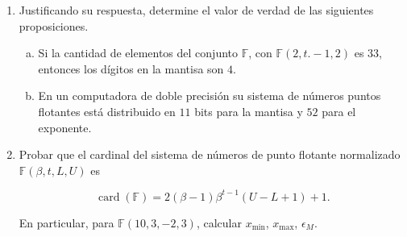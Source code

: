 \documentclass[
	spanish,
	8pt,
	utf8,
	xcolor=table,
	handout,
	aspectratio=169,
	professionalfonts,
	notheorems,
	mathserif,
]{beamer}
\begin{document}
\begin{frame}
\begin{enumerate}
		\item Justificando su respuesta, determine el valor de verdad de
		      las siguientes proposiciones.

		      \begin{enumerate}[a)]
			      \item

			            Si la cantidad de elementos del conjunto
			            $\mathbb{F}$, con $\mathbb{F}(2, t .-1,2)$ es $33$,
			            entonces los dígitos en la mantisa son $4$.

			      \item

			            En un computadora de doble precisión su sistema de
			            números puntos flotantes está distribuido en $11$
			            bits para la mantisa y $52$ para el exponente.

		      \end{enumerate}


		\item

		      Probar que el cardinal del sistema de números de punto
		      flotante normalizado $\mathbb{F}\left(\beta, t, L, U\right)$ es


		      \begin{equation*}
			      \operatorname{card}\left(\mathbb{F}\right)=
			      2\left(\beta-1\right)\beta^{t-1}\left(U-L+1\right)+1.
		      \end{equation*}

		      En particular, para $\mathbb{F}\left(10,3,-2,3\right)$,
		      calcular $x_{\min}$, $x_{\max}$, $\epsilon_{M}$.

	\end{enumerate}
\end{frame}
\end{document}
